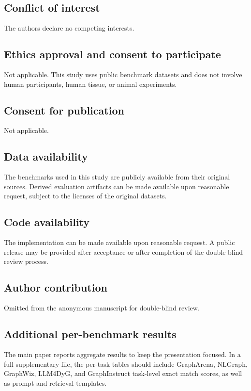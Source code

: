 \documentclass[pdflatex,iicol,sn-mathphys-num]{sn-jnl}
\theoremstyle{thmstyleone}
\theoremstyle{thmstyletwo}
\theoremstyle{thmstylethree}
\begin{document}
\subsection*{Conflict of interest}
The authors declare no competing interests.

\subsection*{Ethics approval and consent to participate}
Not applicable. This study uses public benchmark datasets and does not involve human participants, human tissue, or animal experiments.

\subsection*{Consent for publication}
Not applicable.

\subsection*{Data availability}
The benchmarks used in this study are publicly available from their original sources. Derived evaluation artifacts can be made available upon reasonable request, subject to the licenses of the original datasets.

\subsection*{Code availability}
The implementation can be made available upon reasonable request. A public release may be provided after acceptance or after completion of the double-blind review process.

\subsection*{Author contribution}
Omitted from the anonymous manuscript for double-blind review.

\begin{appendices}

\section{Additional per-benchmark results}\label{app:details}

The main paper reports aggregate results to keep the presentation focused. In a full supplementary file, the per-task tables should include GraphArena, NLGraph, GraphWiz, LLM4DyG, and GraphInstruct task-level exact match scores, as well as prompt and retrieval templates.

\end{appendices}


\end{document}
